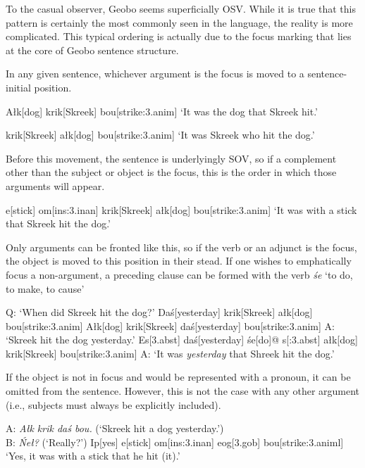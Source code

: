 \documentclass[a4paper,11pt,oneside,openany]{memoir}
\begin{document}
To the casual observer, Geobo{\engma} seems superficially OSV. While it is true that this pattern is certainly the most commonly seen in the language, the reality is more complicated. This typical ordering is actually due to the focus marking that lies at the core of Geobo{\engma} sentence structure.

In any given sentence, whichever argument is the focus is moved to a sentence-initial position. 

\ex
\begingl
A\l k[dog]
\vS krik[Skreek]
bo\vl\vs u[strike:{\sc 3.anim}]
\glft `It was the dog that Skreek hit.'
\endgl
\xe

\ex
\begingl
\vS krik[Skreek]
a\l k[dog]
bo\vl\vs u[strike:{\sc 3.anim}]
\glft `It was Skreek who hit the dog.'
\endgl
\xe

Before this movement, the sentence is underlyingly SOV, so if a complement other than the subject or object is the focus, this is the order in which those arguments will appear.

\ex
\begingl
\vT\vn e{\vl}[stick]
\vc om[\sc ins:3.inan]
\vS krik[Skreek]
a\l k[dog]
bo\vl\vs u[strike:{\sc 3.anim}]
\glft `It was with a stick that Skreek hit the dog.'
\endgl
\xe

Only arguments can be fronted like this, so if the verb or an adjunct is the focus, the object is moved to this position in their stead. If one wishes to emphatically focus a non-argument, a preceding clause can be formed with the verb \textit{\'se} `to do, to make, to cause'

\pex Q: `When did Skreek hit the dog?'
\a \ljudge*
\begingl
Da\'s[yesterday]
\vS krik[Skreek]
a\l k[dog]
bo\vl\vs u[strike:{\sc 3.anim}]
\endgl
\a 
\begingl
A\l k[dog]
\vS krik[Skreek] 
da\'s[yesterday]
bo\vl\vs u[strike:{\sc 3.anim}]
\glft A: `Skreek hit the dog yesterday.'
\endgl
\a 
\begingl
Es[\sc 3.abst]
da\'s[yesterday]
\'se[do]@
s[\sc :3.abst]
\nogloss{,}
a\l k[dog]
\vS krik[Skreek]
bo\vl\vs u[strike:{\sc 3.anim}]
\glft A: `It was \emph{yesterday} that Shreek hit the dog.'
\endgl
\xe

If the object is not in focus and would be represented with a pronoun, it can be omitted from the sentence. However, this is not the case with any other argument (i.e., subjects must always be explicitly included).

\ex
\begingl
\glpreamble A: \textit{A\l k \vS krik da\'s bo\vl\vs u.} (`Skreek hit a dog yesterday.')\\B: \textit{\'Ne\l?} (`Really?')\endpreamble
Ip[yes]
\vt\vn e{\vl}[stick]
\vc om[\sc ins:3.inan]
eog[{\sc 3.gob}]
bo\vl\vs u[strike:{\sc 3.animl}]
\glft `Yes, it was with a stick that he hit (it).'
\endgl
\xe
\end{document}
